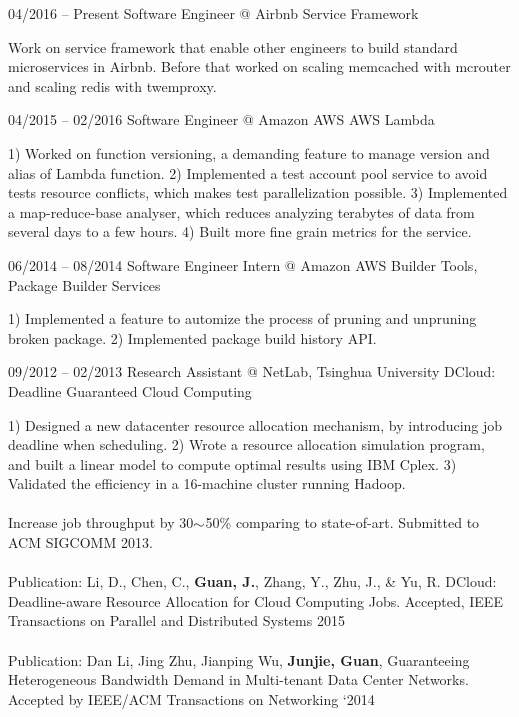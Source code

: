\documentclass{tccv}
\begin{document}
\begin{eventlist}

\item{04/2016 -- Present}
     {Software Engineer @ Airbnb}
     {Service Framework}
     
     Work on service framework that enable other engineers to build standard microservices in Airbnb. Before that worked on scaling memcached with mcrouter and scaling redis with twemproxy.
     

\item{04/2015 -- 02/2016}
     {Software Engineer @ Amazon AWS}
     {AWS Lambda}
     
     1) Worked on function versioning, a demanding feature to manage version and alias of Lambda function.  2) Implemented a test account pool service to avoid tests resource conflicts, which makes test parallelization possible. 3) Implemented a map-reduce-base analyser, which reduces analyzing terabytes of data from several days to a few hours. 4) Built more fine grain metrics for the service.

\item{06/2014 -- 08/2014}
     {Software Engineer Intern @ Amazon AWS}
     {Builder Tools, Package Builder Services}
     
    1) Implemented a feature to automize the process of pruning and unpruning broken package. 2) Implemented package build history API.
     
\item{09/2012 -- 02/2013}
     {Research Assistant @ NetLab, Tsinghua University}
     {DCloud: Deadline Guaranteed Cloud Computing}
     
     1) Designed a new datacenter resource allocation mechanism, by introducing job deadline when scheduling. 2) Wrote a resource allocation simulation program, and built a linear model to compute optimal results using IBM Cplex. 3) Validated the efficiency in a 16-machine cluster running Hadoop.
     \\\\
     Increase job throughput by 30$\scriptsize{\sim}$50\% comparing to state-of-art. Submitted to ACM SIGCOMM 2013.
     \\\\
     Publication: Li, D., Chen, C., \textbf{Guan, J.}, Zhang, Y., Zhu, J., \& Yu, R. DCloud: Deadline-aware Resource Allocation for Cloud Computing Jobs. Accepted, IEEE Transactions on Parallel and Distributed Systems 2015
     \\\\
     Publication: Dan Li, Jing Zhu, Jianping Wu, \textbf{Junjie, Guan}, Guaranteeing Heterogeneous Bandwidth Demand in Multi-tenant Data Center Networks. Accepted by IEEE/ACM Transactions on Networking ‘2014


\end{eventlist}
\end{document}

